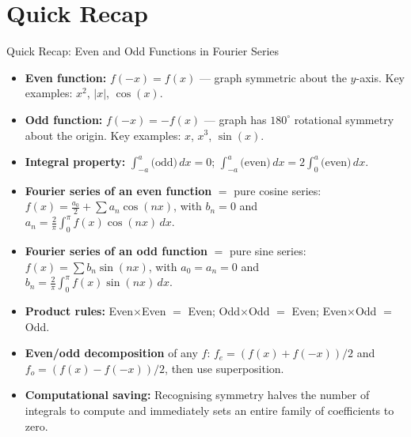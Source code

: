 \documentclass[12pt,a4paper]{article}
\begin{document}
\section{Quick Recap}

\begin{learnbox}{Quick Recap: Even and Odd Functions in Fourier Series}
\begin{itemize}[nosep]
  \item \textbf{Even function:} $f(-x) = f(x)$ --- graph symmetric about the $y$-axis.
    Key examples: $x^2$, $|x|$, $\cos(x)$.
  \item \textbf{Odd function:} $f(-x) = -f(x)$ --- graph has $180^{\circ}$ rotational symmetry
    about the origin. Key examples: $x$, $x^3$, $\sin(x)$.
  \item \textbf{Integral property:}
    $\int_{-a}^{a}\text{(odd)}\,dx = 0$; \quad
    $\int_{-a}^{a}\text{(even)}\,dx = 2\int_0^a\text{(even)}\,dx$.
  \item \textbf{Fourier series of an even function} $=$ pure cosine series:
    $f(x) = \frac{a_0}{2}+\sum a_n\cos(nx)$, with $b_n = 0$ and
    $a_n = \frac{2}{\pi}\int_0^{\pi}f(x)\cos(nx)\,dx$.
  \item \textbf{Fourier series of an odd function} $=$ pure sine series:
    $f(x) = \sum b_n\sin(nx)$, with $a_0 = a_n = 0$ and
    $b_n = \frac{2}{\pi}\int_0^{\pi}f(x)\sin(nx)\,dx$.
  \item \textbf{Product rules:} Even$\times$Even $=$ Even; Odd$\times$Odd $=$ Even;
    Even$\times$Odd $=$ Odd.
  \item \textbf{Even/odd decomposition} of any $f$:
    $f_e = (f(x)+f(-x))/2$ and $f_o = (f(x)-f(-x))/2$, then use superposition.
  \item \textbf{Computational saving:} Recognising symmetry halves the number of integrals
    to compute and immediately sets an entire family of coefficients to zero.
\end{itemize}
\end{learnbox}
\end{document}
